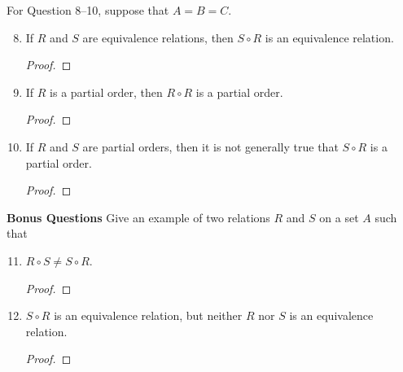 \documentclass{article}
\begin{document}
  For Question 8–10, suppose that $A = B = C$.
  \begin{enumerate} \setcounter{enumi}{7}
    \item If $R$ and $S$ are equivalence relations, then $S \circ R$ is an equivalence relation.
      \begin{proof}
        
      \end{proof}
    \item If $R$ is a partial order, then $R \circ R$ is a partial order.
      \begin{proof}
        
      \end{proof}
    \item If $R$ and $S$ are partial orders, then it is not generally true that $S \circ R$ is a partial order.
      \begin{proof}
        
      \end{proof}
  \end{enumerate}
  \textbf{Bonus Questions}
  Give an example of two relations $R$ and $S$ on a set $A$ such that \\
  \begin{enumerate} \setcounter{enumi}{10}
    \item $R \circ S \neq S \circ R$.
      \begin{proof}
        
      \end{proof}
    \item $S \circ R$ is an equivalence relation, but neither $R$ nor $S$ is an equivalence relation.
      \begin{proof}
        
      \end{proof}
   \end{enumerate}
\end{document}

